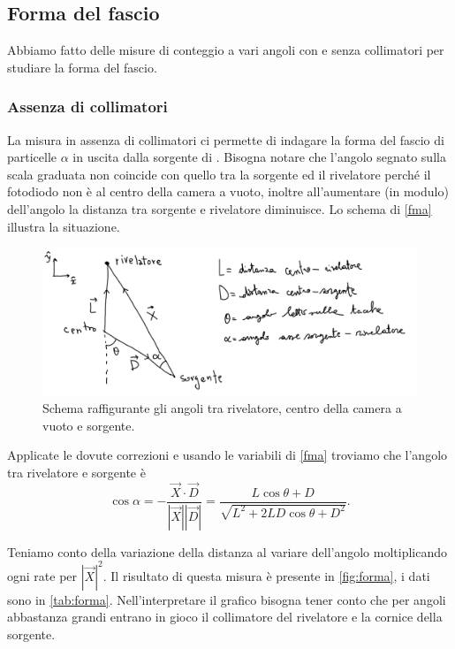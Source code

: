 \subsection{Forma del fascio}
\label{sec:forma}

Abbiamo fatto delle misure di conteggio a vari angoli con e senza collimatori per studiare la forma del fascio.

\subsubsection{Assenza di collimatori}

La misura in assenza di collimatori ci permette di indagare la forma del fascio di particelle $\alpha$ in uscita dalla sorgente di \am{}.
Bisogna notare che l'angolo segnato sulla scala graduata non coincide con quello tra la sorgente ed il rivelatore perché il fotodiodo non è al centro della camera a vuoto, inoltre all'aumentare (in modulo) dell'angolo la distanza tra sorgente e rivelatore diminuisce. 
Lo schema di \autoref{fma} illustra la situazione.

\begin{figure}[h]
\centering
\includegraphics[width=30 em]{immagini/fma_provv}
\caption{Schema raffigurante gli angoli tra rivelatore, centro della camera a vuoto e sorgente.}
\label{fma}
\end{figure}

Applicate le dovute correzioni e usando le variabili di \autoref{fma} troviamo che l'angolo tra rivelatore e sorgente è
\begin{equation}
\cos{\alpha}= -\frac{\vec{X} \cdot \vec{D} }{ |\vec{X}| |\vec{D}| } = \frac{ L \cos{\theta} + D }{ \sqrt{ L^2+2LD\cos{\theta}+D^2  } }.
\end{equation}

Teniamo conto della variazione della distanza al variare dell'angolo moltiplicando ogni rate per $|\vec{X}|^2$.
Il risultato di questa misura è presente in \autoref{fig:forma}, i dati sono in \autoref{tab:forma}.
Nell'interpretare il grafico bisogna tener conto che per angoli abbastanza grandi
entrano in gioco il collimatore del rivelatore e la cornice della sorgente.

